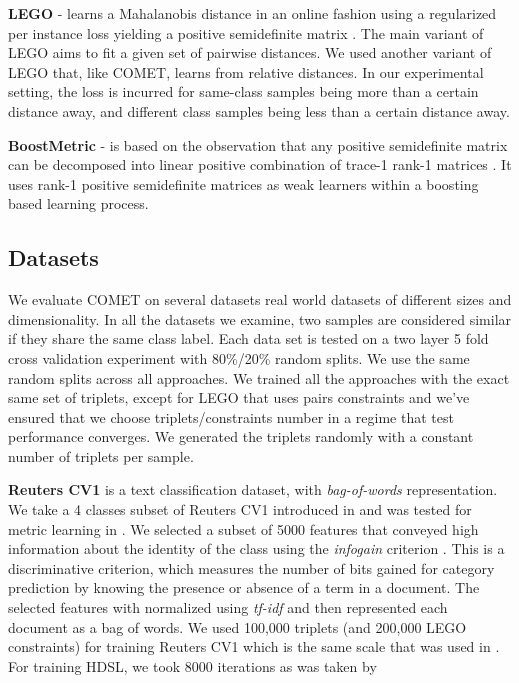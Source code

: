\documentclass{article}
\begin{document}
\textbf{LEGO} - learns a Mahalanobis distance in an online fashion using a regularized per instance loss yielding a positive semidefinite matrix \cite{lego}. The main variant of LEGO aims to fit a given set of pairwise distances. We used another variant of LEGO that, like COMET, learns from relative distances. In our experimental setting, the loss is incurred for same-class samples being more than a certain distance away, and different class samples being less than a certain distance away.

\textbf{BoostMetric} - is based on the observation that any positive semidefinite matrix can be decomposed into linear positive combination of trace-1 rank-1 matrices  \cite{boost}. It uses rank-1 positive semidefinite matrices as weak learners within a boosting based learning process.


\subsection{Datasets}
We evaluate COMET on several datasets real world datasets of different sizes and dimensionality. In all the datasets we examine, two samples are considered similar if they share the same class label. Each data set is tested on a two layer 5 fold cross validation experiment with 80\%/20\% random splits. We use the same random splits across all approaches. We trained all the approaches with the exact same set of triplets, except for LEGO that uses pairs constraints and we've ensured that we choose triplets/constraints number in a regime that test performance converges. We generated the triplets randomly with a constant number of triplets per sample.

\textbf{Reuters CV1} is a text classification dataset, with \textit{bag-of-words} representation. We take a 4 classes subset of Reuters CV1 introduced in \cite{CaiRCV14} and was tested for metric learning in \cite{hdsl}. We selected a subset of 5000 features that conveyed high information about the identity of the class using the \textit{infogain} criterion \cite{infogain}. This is a discriminative criterion, which measures the number of bits gained for category prediction by knowing the presence or absence of a term in a document. The selected features with normalized using \textit{tf-idf} and then represented each document as a bag of words.  
We used 100,000 triplets (and 200,000 LEGO constraints) for training Reuters CV1 which is the same scale that was used in \cite{hdsl}. For training HDSL, we took 8000 iterations as was taken by \cite{hdsl}
\end{document}
